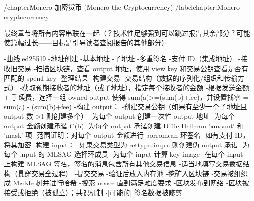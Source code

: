 /chapter{Monero 加密货币 (Monero the Cryptocurrency)}
/label{chapter:Monero-cryptocurrency}

最终章节将所有内容串联在一起（？技术性足够强到可以跳过报告其余部分？可能使篇幅过长——目标是引导读者查阅报告的其他部分）


-曲线 ed25519
-地址创建
    -基本地址
    -子地址
    -多重签名
    -支付 ID（集成地址）
-接收旧交易
    -扫描区块链，查看 output 地址，使用 view key 和交易公钥查看是否有匹配的 spend key
    -整理结果
-构建交易
    -交易结构（数据的序列化/组织和传输方式）
    -获取预期接收者的地址（或子地址），指定每个接收者的金额
    -根据发送金额 + 手续费，选择一组 owned output 使得 sum(a)>=(sum(b)+fee)，并设置找零 = sum(a) - (sum(b)+fee)
    -构建 output：
        -创建交易公钥（如果有至少一个子地址且 output 数 >1 则创建多个）
        -为每个 output 创建一次性 output 地址
        -为每个 output 金额创建承诺 C(b)
        -为每个 output 承诺创建 Diffie-Hellman 'amount' 和 'mask' 项
        -范围证明：对每个 output 金额进行 borromean 环签名
        -如有支付 ID，将其加密
    -构建 input：
        -如果交易类型为 rcttypesimple 则创建伪 output 承诺
        -为每个 input 的 MLSAG 选择环成员
        -为每个 input 计算 key image
        -在每个 input 上构建 MLSAG 签名，签名的消息包含所有其他交易信息
    -适当地填写交易数据结构（贯穿交易全过程）
-提交交易
    -验证后放入内存池
-挖矿入区块链
    -交易被组织成 Merkle 树并进行哈希
    -搜索 nonce 直到满足难度要求
    -区块发布到网络
    -区块被接受或拒绝（被孤立）；共识机制
    -[可能的] 签名数据被修剪
